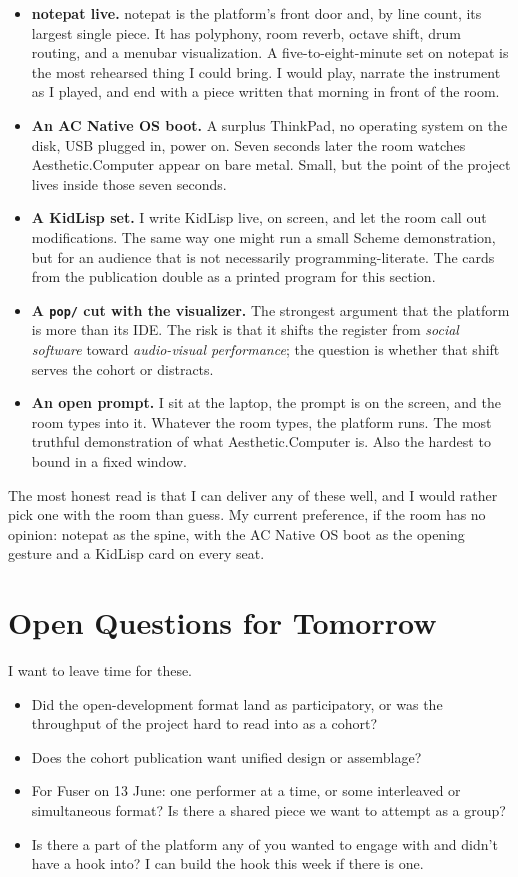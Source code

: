 \documentclass[11pt,letterpaper]{article}
\newcommand{\ac}{Aesthetic\textcolor{acpink}{.}Computer}
\newcommand{\acos}{AC Native OS}
\newcommand{\np}{notepat}
\begin{document}
\begin{itemize}
  \item \textbf{\np{} live.} \np{} is the platform's front door and, by line count, its largest single piece. It has polyphony, room reverb, octave shift, drum routing, and a menubar visualization. A five-to-eight-minute set on \np{} is the most rehearsed thing I could bring. I would play, narrate the instrument as I played, and end with a piece written that morning in front of the room.
  \item \textbf{An \acos{} boot.} A surplus ThinkPad, no operating system on the disk, USB plugged in, power on. Seven seconds later the room watches \ac{} appear on bare metal. Small, but the point of the project lives inside those seven seconds.
  \item \textbf{A KidLisp set.} I write KidLisp live, on screen, and let the room call out modifications. The same way one might run a small Scheme demonstration, but for an audience that is not necessarily programming-literate. The cards from the publication double as a printed program for this section.
  \item \textbf{A \texttt{pop/} cut with the visualizer.} The strongest argument that the platform is more than its IDE. The risk is that it shifts the register from \emph{social software} toward \emph{audio-visual performance}; the question is whether that shift serves the cohort or distracts.
  \item \textbf{An open prompt.} I sit at the laptop, the prompt is on the screen, and the room types into it. Whatever the room types, the platform runs. The most truthful demonstration of what \ac{} is. Also the hardest to bound in a fixed window.
\end{itemize}

The most honest read is that I can deliver any of these well, and I would rather pick one with the room than guess. My current preference, if the room has no opinion: \np{} as the spine, with the \acos{} boot as the opening gesture and a KidLisp card on every seat.

\section{Open Questions for Tomorrow}

I want to leave time for these.

\begin{itemize}
  \item Did the open-development format land as participatory, or was the throughput of the project hard to read into as a cohort?
  \item Does the cohort publication want unified design or assemblage?
  \item For Fuser on 13 June: one performer at a time, or some interleaved or simultaneous format? Is there a shared piece we want to attempt as a group?
  \item Is there a part of the platform any of you wanted to engage with and didn't have a hook into? I can build the hook this week if there is one.
\end{itemize}
\end{document}
